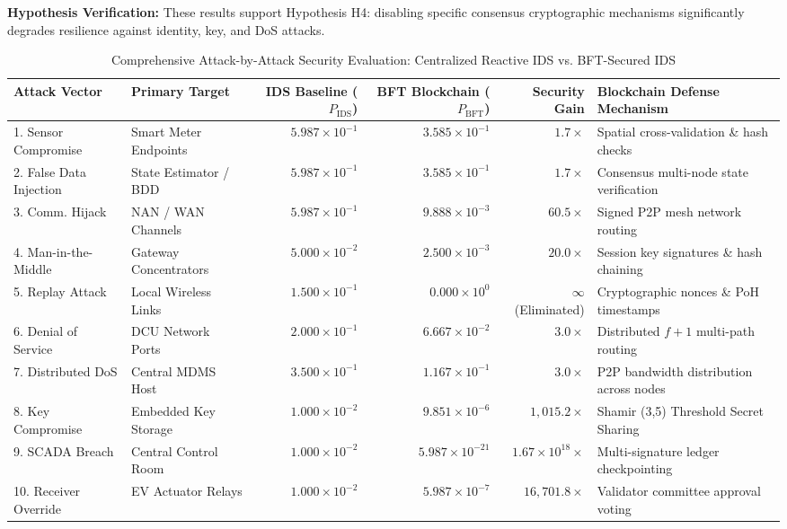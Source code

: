 \documentclass[10pt,twocolumn,journal]{IEEEtran}
\begin{document}
\noindent\textbf{Hypothesis Verification:} These results support Hypothesis H4: disabling specific consensus cryptographic mechanisms significantly degrades resilience against identity, key, and DoS attacks.

\begin{table}[t]
\caption{Comprehensive Attack-by-Attack Security Evaluation: Centralized Reactive IDS vs. BFT-Secured IDS}
\label{tab:attack_comparison}
\centering
\scriptsize
\begin{tabularx}{\textwidth}{@{}lXrrrX@{}}
\toprule
\textbf{Attack Vector} & \textbf{Primary Target} & \textbf{IDS Baseline ($P_{\text{IDS}}$)} & \textbf{BFT Blockchain ($P_{\text{BFT}}$)} & \textbf{Security Gain} & \textbf{Blockchain Defense Mechanism} \\
\midrule
1. Sensor Compromise & Smart Meter Endpoints & $5.987 \times 10^{-1}$ & $3.585 \times 10^{-1}$ & $1.7\times$ & Spatial cross-validation \& hash checks \\
2. False Data Injection & State Estimator / BDD & $5.987 \times 10^{-1}$ & $3.585 \times 10^{-1}$ & $1.7\times$ & Consensus multi-node state verification \\
3. Comm. Hijack & NAN / WAN Channels & $5.987 \times 10^{-1}$ & $9.888 \times 10^{-3}$ & $60.5\times$ & Signed P2P mesh network routing \\
4. Man-in-the-Middle & Gateway Concentrators & $5.000 \times 10^{-2}$ & $2.500 \times 10^{-3}$ & $20.0\times$ & Session key signatures \& hash chaining \\
5. Replay Attack & Local Wireless Links & $1.500 \times 10^{-1}$ & $0.000 \times 10^{0}$ & $\infty$ (Eliminated) & Cryptographic nonces \& PoH timestamps \\
6. Denial of Service & DCU Network Ports & $2.000 \times 10^{-1}$ & $6.667 \times 10^{-2}$ & $3.0\times$ & Distributed $f+1$ multi-path routing \\
7. Distributed DoS & Central MDMS Host & $3.500 \times 10^{-1}$ & $1.167 \times 10^{-1}$ & $3.0\times$ & P2P bandwidth distribution across nodes \\
8. Key Compromise & Embedded Key Storage & $1.000 \times 10^{-2}$ & $9.851 \times 10^{-6}$ & $1,015.2\times$ & Shamir (3,5) Threshold Secret Sharing \\
9. SCADA Breach & Central Control Room & $1.000 \times 10^{-2}$ & $5.987 \times 10^{-21}$ & $1.67 \times 10^{18}\times$ & Multi-signature ledger checkpointing \\
10. Receiver Override & EV Actuator Relays & $1.000 \times 10^{-2}$ & $5.987 \times 10^{-7}$ & $16,701.8\times$ & Validator committee approval voting \\

\end{tabularx}
\end{table}
\end{document}
